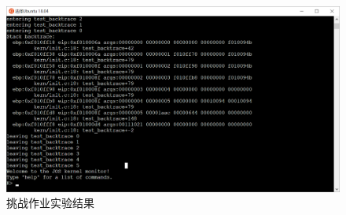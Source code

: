 \documentclass[12pt,a4paper,UTF8]{article}
\begin{document}
\begin{figure}[H]
    \centering
    \includegraphics[width = .85\linewidth]{img/ch.png}
    \caption{挑战作业实验结果}
    \label{fig::figurech}
\end{figure}


% 
\end{document}
